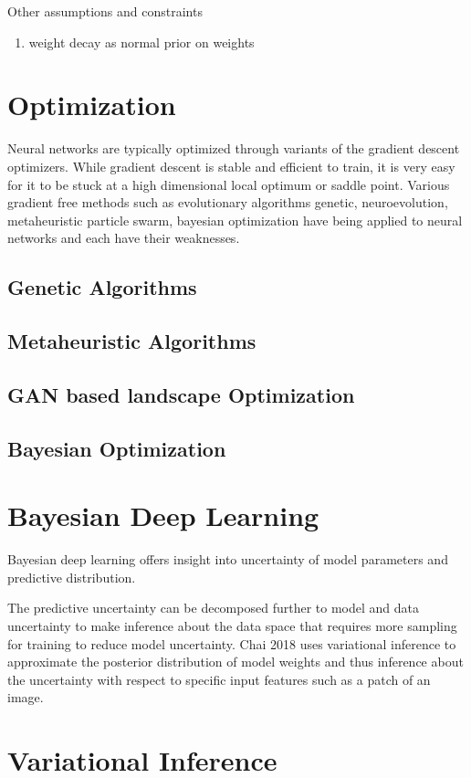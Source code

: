 \documentclass[honours,12pt]{unswthesis}
\numberwithin{equation}{section}
\begin{document}
Other assumptions and constraints
\begin{enumerate}
\item weight decay as normal prior on weights
\end{enumerate}

\section{Optimization}
Neural networks are typically optimized through variants of the gradient descent optimizers. While gradient descent is stable and efficient to train, it is very easy for it to be stuck at a high dimensional local optimum or saddle point. Various gradient free methods such as evolutionary algorithms {genetic, neuroevolution}, metaheuristic {particle swarm}, bayesian optimization {} have being applied to neural networks and each have their weaknesses. 
\subsection{Genetic Algorithms}
\subsection{Metaheuristic Algorithms}
\subsection{GAN based landscape Optimization}
\subsection{Bayesian Optimization}

\section{Bayesian Deep Learning}
Bayesian deep learning offers insight into uncertainty of model parameters and predictive distribution. 

The predictive uncertainty can be decomposed further to model and data uncertainty to make inference about the data space that requires more sampling for training to reduce model uncertainty. Chai 2018 \cite{Chai2018uncertainBNN} uses variational inference to approximate the posterior distribution of model weights and thus inference about the uncertainty with respect to specific input features such as a patch of an image. 

\section{Variational Inference}
\end{document}
